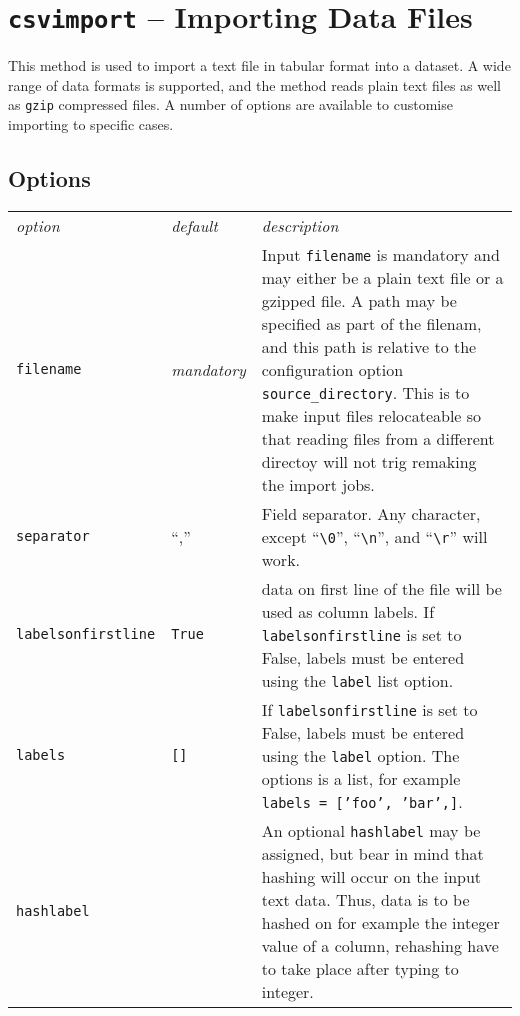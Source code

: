 \section{\texttt{csvimport} -- Importing Data Files}

This method is used to import a text file in tabular format into a
dataset.  A wide range of data formats is supported, and the method
reads plain text files as well as \texttt{gzip} compressed files.  A
number of options are available to customise importing to specific
cases.


\subsection{Options}

\begin{tabular}{ l l p{10cm}}
  \textsl{option} & \textsl{default} & \textsl{description}\\[2ex]

  \texttt{filename} & \emph{mandatory} & Input \texttt{filename} is mandatory
  and may either be a plain text file or a gzipped file.  A path may
  be specified as part of the filenam, and this path is relative to
  the configuration option \texttt{source\_directory}.  This is to
  make input files relocateable so that reading files from a different
  directoy will not trig remaking the import jobs.\\[1ex]

  \texttt{separator} & ``,'' & Field separator.  Any character, except
  ``\verb$\0$'', ``\verb$\n$'', and ``\verb$\r$'' will work.\\[1ex]

  \texttt{labelsonfirstline} & \texttt{True} & data on first line of
  the file will be used as column labels.  If
  \texttt{labelsonfirstline} is set to False, labels must be entered
  using the \texttt{label} list option.\\[1ex]

  \texttt{labels} & \texttt{[]} & If \texttt{labelsonfirstline} is set
  to False, labels must be entered using the \texttt{label} option.
  The options is a list, for example \texttt{labels = ['foo',
      'bar',]}.\\[1ex]

  \texttt{hashlabel} & & An optional \texttt{hashlabel} may be
  assigned, but bear in mind that hashing will occur on the input text
  data.  Thus, data is to be hashed on for example the integer value
  of a column, rehashing have to take place after typing to
  integer.\\[1ex]


\end{tabular}
